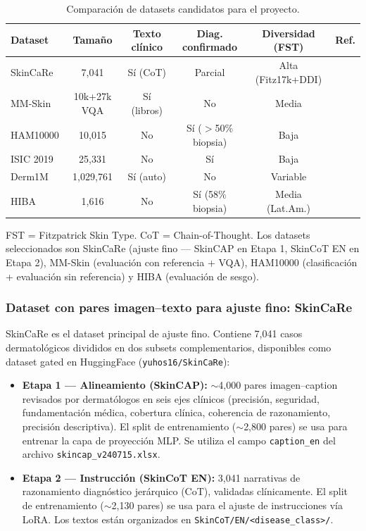 \documentclass[11pt, a4paper]{article}
\begin{document}
\begin{table}[H]
\centering
\caption{Comparación de datasets candidatos para el proyecto.}
\label{tab:datasets_comp}
\small
\begin{tabular}{@{}lccccl@{}}
\toprule
\textbf{Dataset} & \textbf{Tamaño} & \textbf{Texto clínico} & \textbf{Diag. confirmado} & \textbf{Diversidad (FST)} & \textbf{Ref.} \\
\midrule
SkinCaRe & 7,041 & Sí (CoT) & Parcial & Alta (Fitz17k+DDI) & \cite{xu_skincare_2025} \\
MM-Skin & 10k+27k VQA & Sí (libros) & No & Media & \cite{zhao_mm-skin_2025} \\
HAM10000 & 10,015 & No & Sí ($>$50\% biopsia) & Baja & \cite{tschandl_ham10000_2018} \\
ISIC 2019 & 25,331 & No & Sí & Baja & \cite{tschandl_ham10000_2018} \\
Derm1M & 1,029,761 & Sí (auto) & No & Variable & \cite{yan_derm1m_2025} \\
HIBA & 1,616 & No & Sí (58\% biopsia) & Media (Lat.Am.) & \cite{piashiba_hiba_2023} \\
\bottomrule
\end{tabular}
\begin{flushleft}
\small FST = Fitzpatrick Skin Type. CoT = Chain-of-Thought. Los datasets seleccionados son SkinCaRe (ajuste fino — SkinCAP en Etapa 1, SkinCoT EN en Etapa 2), MM-Skin (evaluación con referencia + VQA), HAM10000 (clasificación + evaluación sin referencia) y HIBA (evaluación de sesgo).
\end{flushleft}
\end{table}

\subsubsection{Dataset con pares imagen--texto para ajuste fino: SkinCaRe}
\label{sec:skincare_training}

SkinCaRe \cite{xu_skincare_2025} es el dataset principal de ajuste fino. Contiene 7,041 casos dermatológicos divididos en dos subsets complementarios, disponibles como dataset gated en HuggingFace (\texttt{yuhos16/SkinCaRe}):

\begin{itemize}
    \item \textbf{Etapa 1 — Alineamiento (SkinCAP):} $\sim$4,000 pares imagen--caption revisados por dermatólogos en seis ejes clínicos (precisión, seguridad, fundamentación médica, cobertura clínica, coherencia de razonamiento, precisión descriptiva). El split de entrenamiento ($\sim$2,800 pares) se usa para entrenar la capa de proyección MLP. Se utiliza el campo \texttt{caption\_en} del archivo \texttt{skincap\_v240715.xlsx}.
    \item \textbf{Etapa 2 — Instrucción (SkinCoT EN):} 3,041 narrativas de razonamiento diagnóstico jerárquico (CoT), validadas clínicamente. El split de entrenamiento ($\sim$2,130 pares) se usa para el ajuste de instrucciones vía LoRA. Los textos están organizados en \texttt{SkinCoT/EN/<disease\_class>/}.
\end{itemize}
\end{document}
